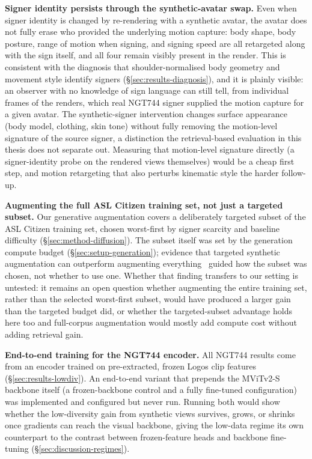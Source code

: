 \textbf{Signer identity persists through the synthetic-avatar swap.}
Even
when signer identity is changed by re-rendering with a synthetic avatar,
the avatar does not fully erase who provided the underlying motion
capture: body shape, body posture, range of motion when signing, and
signing speed are all retargeted along with the sign itself, and all four
remain visibly present in the render. This is consistent with the
diagnosis that shoulder-normalised body geometry and movement style
identify signers (\S\ref{sec:results-diagnosis}), and it is plainly
visible: an observer with no knowledge of sign language can still tell,
from individual frames of the renders, which real NGT744 signer supplied
the motion capture for a given avatar. The synthetic-signer
intervention changes surface appearance (body model, clothing, skin
tone) without fully removing the motion-level signature of the source
signer, a distinction the retrieval-based evaluation in this thesis does
not separate out. Measuring that motion-level signature directly (a
signer-identity probe on the rendered views themselves) would be a
cheap first step, and motion retargeting that also perturbs kinematic
style the harder follow-up.

\textbf{Augmenting the full ASL Citizen training set, not just a targeted
subset.} Our generative augmentation covers a deliberately targeted subset
of the ASL Citizen training set, chosen worst-first by signer scarcity and
baseline difficulty (\S\ref{sec:method-diffusion}). The subset itself was
set by the generation compute budget (\S\ref{sec:setup-generation});
evidence that targeted synthetic augmentation can outperform augmenting
everything~\cite{nguyenDoWeNeedSynthetic2025} guided how the subset was
chosen, not whether to use one.
Whether that finding transfers to our setting is untested: it remains an
open question whether augmenting the entire training set, rather than the
selected worst-first subset, would have produced a larger gain
than the targeted budget did, or whether the targeted-subset advantage
holds here too and full-corpus augmentation would mostly add compute cost
without adding retrieval gain.

\textbf{End-to-end training for the NGT744 encoder.} All NGT744 results come
from an encoder trained on pre-extracted, frozen Logos clip features
(\S\ref{sec:results-lowdiv}). An end-to-end variant that prepends
the MViTv2-S backbone itself (a frozen-backbone control and a fully
fine-tuned configuration) was implemented and configured but never
run. Running both would show whether the low-diversity gain from
synthetic views survives, grows, or shrinks once gradients can reach the
visual backbone, giving the low-data regime its own counterpart to the
contrast between frozen-feature heads and backbone
fine-tuning (\S\ref{sec:discussion-regimes}).

